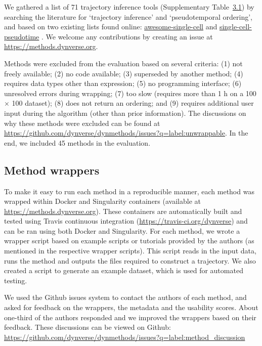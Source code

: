 We gathered a list of 71 trajectory inference tools (Supplementary Table~\hyperref[tab:supptable_1]{3.1}) by searching the literature for ‘trajectory inference’ and ‘pseudotemporal ordering’, and based on two existing lists found online: \href{https://github.com/seandavi/awesome-single-cell}{awesome-single-cell} \cite{davis_awesomesinglecell_2018} and \href{https://github.com/agitter/single-cell-pseudotime}{single-cell-pseudotime} \cite{gitter_singlecellrnaseqpseudotime_2018}. We welcome any contributions by creating an issue at \href{https://methods.dynverse.org}{https://methods.dynverse.org}.

Methods were excluded from the evaluation based on several criteria: (1) not freely available; (2) no code available; (3) superseded by another method; (4) requires data types other than expression; (5) no programming interface; (6) unresolved errors during wrapping; (7) too slow (requires more than 1 h on a 100 $\times$ 100 dataset); (8) does not return an ordering; and (9) requires additional user input during the algorithm (other than prior information). The discussions on why these methods were excluded can be found at \href{https://github.com/dynverse/dynmethods/issues?q=label:unwrappable}{https://github.com/dynverse/dynmethods/issues?q=label:unwrappable}. In the end, we included 45 methods in the evaluation.


\subsection{Method wrappers}

To make it easy to run each method in a reproducible manner, each method was wrapped within Docker and Singularity containers (available at \href{https://methods.dynverse.org}{https://methods.dynverse.org}). These containers are automatically built and tested using Travis continuous integration (\href{https://travis-ci.org/dynverse}{https://travis-ci.org/dynverse}) and can be ran using both Docker and Singularity. For each method, we wrote a wrapper script based on example scripts or tutorials provided by the authors (as mentioned in the respective wrapper scripts). This script reads in the input data, runs the method and outputs the files required to construct a trajectory. We also created a script to generate an example dataset, which is used for automated testing.

We used the Github issues system to contact the authors of each method, and asked for feedback on the wrappers, the metadata and the usability scores. About one-third of the authors responded and we improved the wrappers based on their feedback. These discussions can be viewed on Github: \href{https://github.com/dynverse/dynmethods/issues?q=label:method_discussion}{https://github.com/dynverse/dynmethods/issues?q=label:method\_discussion}

